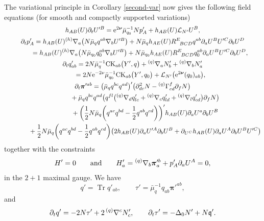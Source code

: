 \documentclass[11pt]{article}
\numberwithin{equation}{section}
\def\ptl{\partial}%
\def\mbo#1{\boldsymbol{#1}}%
\def\grad{{\nabla}}%
\newcommand{\leftexp}[2]{{\vphantom{#2}}^{#1}{#2}}
\def\halb{\frac{1}{2}}%
\numberwithin{equation}{section}
\begin{document}
The variational principle in Corollary \ref{second-var} now gives the following field equations (for smooth and compactly supported variations)
\begin{gather*}
 h_{AB}(U) \ptl_t U'^B= {\rm e}^{2 \mbo{\nu}}\bar{\mu}^{-1}_{q_0} N p'_A + h_{AB}(U) \mathcal{L}_{N'} U^B, \\ %
\ptl_t p'_A = h_{AB} (U) \leftexp{(h)}{\grad}_a \bigl(N \bar{\mu}_{q} q^{ab} \grad_b U'^B\bigr) + N \bar{\mu}_q h_{AE}(U) R^E_{\,\,\,\,BCD} q^{a b} \ptl_a U^B U'^C \ptl_b U^D
\notag\\ \hphantom{\ptl_t p'_A }{}
=h_{AB} (U) \leftexp{(h)}{\grad}_a \bigl(N \bar{\mu}_{q_0} q_0^{ab} \grad_b U'^B\bigr)
+ N \bar{\mu}_{q_0} h_{AE}(U) R^E_{\,\,\,\,BCD} q_0^{a b} \ptl_a U^B U'^C \ptl_b U^D, \\ %
\ptl_t q'_{ab}= 2N \bar{\mu}^{-1}_{q} {\rm CK}_{ab}\bigl(Y', q\bigr)+ \leftexp{(q)}{\grad} _a N'_b + \leftexp{(q)}{\grad}_b N'_a \notag\\
\hphantom{\ptl_t q'_{ab}}{}
= 2N {\rm e}^{-2 \nu} \bar{\mu}^{-1}_{q_0} {\rm CK}_{ab}\bigl(Y', q_0\bigr)+ \mathcal{L}_{N'} \bigl({\rm e}^{ 2 \mbo{\nu}}(q_0)_{ab}\bigr), \\
\ptl_t \mbo{\pi}'^{ab} = \bigl(\bar{\mu}_q q^{bc} q^{ad}\bigr)' \bigl(\ptl^2_{dc} N - \leftexp{(q)}{\Gamma} ^f_{cd} \ptl_f N\bigr) \notag\\
\hphantom{\ptl_t \mbo{\pi}'^{ab} =}
+ \bar{\mu}_q q^{bc} q^{ad} \bigl(q^{fl} \bigl(\leftexp{(q)}{\grad} _d q'_{l c} + \leftexp{(q)}{\grad} _c q'_{l d}+\leftexp{(q)}{\grad} _l q'_{cd}\bigr) \ptl_f N\bigr) \notag\\
\hphantom{\ptl_t \mbo{\pi}'^{ab} =}
+ \biggl(\halb N \bar{\mu}_q \biggl(q^{ac} q^{bd} - \halb q^{ab} q^{cd}\biggr)\biggr)' h_{AB}(U) \ptl_a U^a \ptl_b U^B \notag\\
\hphantom{\ptl_t \mbo{\pi}'^{ab} =}
+ \halb N \bar{\mu}_q \biggl(q^{ac} q^{bd} - \halb q^{ab} q^{cd}\biggr) \bigl(2 h_{AB} (U) \ptl_a U'^A \ptl_b U^B + \ptl_{U^C} h_{AB} (U) \ptl_a U^A \ptl_b U^B U'^C\bigr)
\end{gather*}
together with the constraints
\begin{align*}
H'= 0 \qquad
\text{and}\qquad
H'_a= \leftexp{(q)}{\grad}_b \mbo{\pi}'^b_a + p'_A \ptl_a U^A= 0, %
\end{align*}
in the $2+1$ maximal gauge.
We have
\[
q'= \operatorname{Tr} q'_{ab}, \qquad \tau' = \bar{\mu}^{-1}_q q_{ab} \mbo{\pi}'^{ab},
\]
and
\[
\ptl_t q' = -2N \tau' + 2 \, \leftexp{(q)}{\grad}^c N'_c, \qquad \ptl_t \tau' = - \Delta_0 N' + N \mathfrak{q}'.
\]
\end{document}
